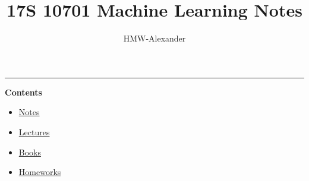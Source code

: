 \documentclass[letterpaper,11pt]{article}
\title{\textbf{17S 10701 Machine Learning Notes}}
\author{HMW-Alexander}
\newcommand{\panhline}{\begin{center}\rule{\textwidth}{1pt}\end{center}}
\begin{document}
\maketitle

\panhline
\textbf{Contents}

\begin{itemize}
	\item \href{./Notes/index.html}{Notes}
	\item \href{./Lectures/index.html}{Lectures}
	\item \href{./Books/index.html}{Books}
	\item \href{./Homeworks/index.html}{Homeworks}
\end{itemize}
	
\end{document}
